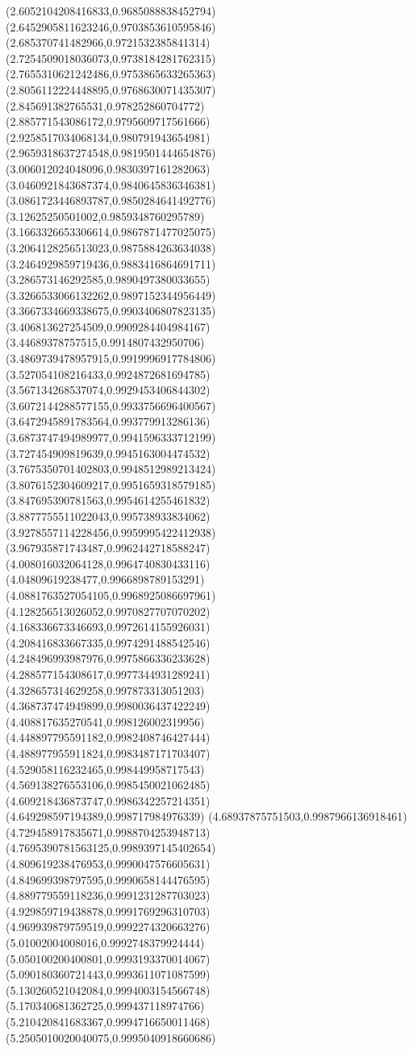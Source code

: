 {(2.6052104208416833,0.9685088838452794)
(2.6452905811623246,0.9703853610595846)
(2.685370741482966,0.9721532385841314)
(2.7254509018036073,0.9738184281762315)
(2.7655310621242486,0.9753865633265363)
(2.8056112224448895,0.9768630071435307)
(2.845691382765531,0.978252860704772)
(2.885771543086172,0.9795609717561666)
(2.9258517034068134,0.980791943654981)
(2.9659318637274548,0.9819501444654876)
(3.006012024048096,0.9830397161282063)
(3.0460921843687374,0.9840645836346381)
(3.0861723446893787,0.9850284641492776)
(3.12625250501002,0.9859348760295789)
(3.1663326653306614,0.9867871477025075)
(3.2064128256513023,0.9875884263634038)
(3.2464929859719436,0.9883416864691711)
(3.286573146292585,0.9890497380033655)
(3.3266533066132262,0.9897152344956449)
(3.3667334669338675,0.9903406807823135)
(3.406813627254509,0.9909284404984167)
(3.44689378757515,0.9914807432950706)
(3.4869739478957915,0.9919996917784806)
(3.527054108216433,0.9924872681694785)
(3.567134268537074,0.9929453406844302)
(3.6072144288577155,0.9933756696400567)
(3.6472945891783564,0.993779913286136)
(3.6873747494989977,0.9941596333712199)
(3.727454909819639,0.9945163004474532)
(3.7675350701402803,0.9948512989213424)
(3.8076152304609217,0.9951659318579185)
(3.847695390781563,0.9954614255461832)
(3.8877755511022043,0.995738933834062)
(3.9278557114228456,0.9959995422412938)
(3.967935871743487,0.9962442718588247)
(4.008016032064128,0.9964740830433116)
(4.04809619238477,0.9966898789153291)
(4.0881763527054105,0.9968925086697961)
(4.128256513026052,0.9970827707070202)
(4.168336673346693,0.9972614155926031)
(4.208416833667335,0.9974291488542546)
(4.248496993987976,0.9975866336233628)
(4.288577154308617,0.9977344931289241)
(4.328657314629258,0.997873313051203)
(4.368737474949899,0.9980036437422249)
(4.408817635270541,0.998126002319956)
(4.448897795591182,0.9982408746427444)
(4.488977955911824,0.9983487171703407)
(4.529058116232465,0.998449958717543)
(4.569138276553106,0.9985450021062485)
(4.609218436873747,0.9986342257214351)
(4.649298597194389,0.998717984976339)
(4.68937875751503,0.9987966136918461)
(4.729458917835671,0.9988704253948713)
(4.7695390781563125,0.9989397145402654)
(4.809619238476953,0.9990047576605631)
(4.849699398797595,0.9990658144476595)
(4.889779559118236,0.9991231287703023)
(4.929859719438878,0.9991769296310703)
(4.969939879759519,0.9992274320663276)
(5.01002004008016,0.9992748379924444)
(5.050100200400801,0.9993193370014067)
(5.090180360721443,0.9993611071087599)
(5.130260521042084,0.9994003154566748)
(5.170340681362725,0.999437118974766)
(5.210420841683367,0.9994716650011468)
(5.2505010020040075,0.9995040918660686)
}
